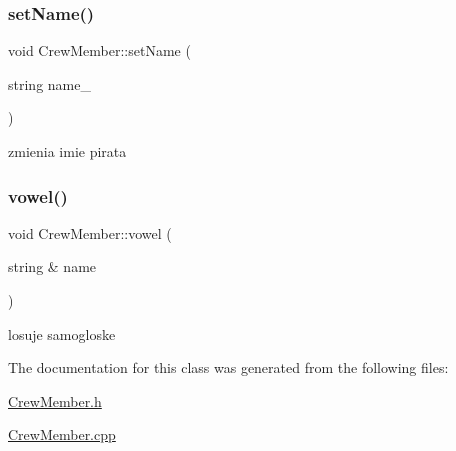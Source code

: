\mbox{\label{class_crew_member_ac2558ae043b9252881a2cbff11b9d27a}} 
\subsubsection{\texorpdfstring{set\+Name()}{setName()}}
{\footnotesize\ttfamily void Crew\+Member\+::set\+Name (\begin{DoxyParamCaption}\item[{string}]{name\+\_\+ }\end{DoxyParamCaption})\hspace{0.3cm}{\ttfamily [inline]}}



zmienia imie pirata 

\mbox{\label{class_crew_member_a9cef5974e00cdd38adfa6c472f551605}} 
\subsubsection{\texorpdfstring{vowel()}{vowel()}}
{\footnotesize\ttfamily void Crew\+Member\+::vowel (\begin{DoxyParamCaption}\item[{string \&}]{name }\end{DoxyParamCaption})}



losuje samogloske 



The documentation for this class was generated from the following files\+:\begin{DoxyCompactItemize}
\item 
\hyperlink{_crew_member_8h}{Crew\+Member.\+h}\item 
\hyperlink{_crew_member_8cpp}{Crew\+Member.\+cpp}\end{DoxyCompactItemize}
